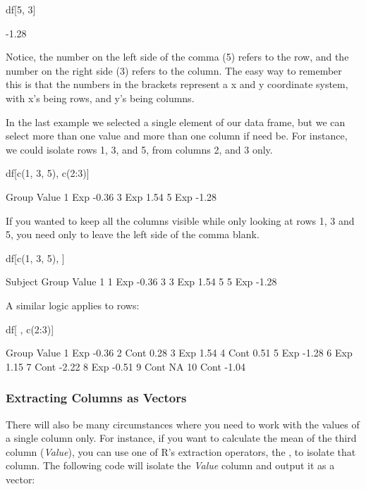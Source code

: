 \begin{inR}
df[5, 3]
\end{inR}
\begin{outR}
[1] -1.28
\end{outR}

Notice, the number on the left side of the comma (5) refers to the row, and the number on the right side (3) refers to the column. The easy way to remember this is that the numbers in the brackets represent a x and y coordinate system, with x's being rows, and y's being columns. 

In the last example we selected a single element of our data frame, but we can select more than one value and more than one column if need be.  For instance, we could isolate rows 1, 3, and 5, from columns 2, and 3 only.

\begin{inR}
df[c(1, 3, 5), c(2:3)]
\end{inR}
\begin{outR}
  Group Value
1   Exp -0.36
3   Exp  1.54
5   Exp -1.28
\end{outR}

\noindent
If you wanted to keep all the columns visible while only looking at rows 1, 3 and 5, you need only to leave the left side of the comma blank.

\begin{inR}
df[c(1, 3, 5), ]
\end{inR}
\begin{outR}
  Subject Group Value
1       1   Exp -0.36
3       3   Exp  1.54
5       5   Exp -1.28
\end{outR}

\noindent
A similar logic applies to rows:

\begin{inR}
df[ , c(2:3)]
\end{inR}
\begin{outR}
   Group Value
1    Exp -0.36
2   Cont  0.28
3    Exp  1.54
4   Cont  0.51
5    Exp -1.28
6    Exp  1.15
7   Cont -2.22
8    Exp -0.51
9   Cont    NA
10  Cont -1.04
\end{outR}

\subsubsection{Extracting Columns as Vectors}

There will also be many circumstances where you need to work with the values of a single column only.  For instance, if you want to calculate the mean of the third column (\textit{Value}), you can use one of R's extraction operators, the \R{\$}, to isolate that column. The following code will isolate the \textit{Value} column and output it as a vector:

